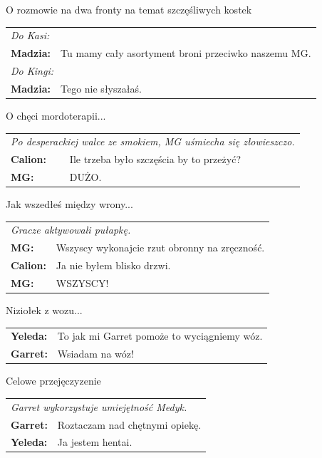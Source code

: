 \documentclass[10pt,twoside,twocolumn]{book}
\begin{document}
\begin{rpg-quotebox}{O rozmowie na dwa fronty na temat szczęśliwych kostek}
   \begin{tabularx}{\columnwidth}{lX}
      \multicolumn{2}{l}{\textit{Do Kasi:}} \\
      \textbf{Madzia:} & Tu mamy cały asortyment broni przeciwko naszemu MG. \\
      \multicolumn{2}{l}{\textit{Do Kingi:}} \\
      \textbf{Madzia:} & Tego nie słyszałaś.
   \end{tabularx}
\end{rpg-quotebox}


\begin{rpg-quotebox}{O chęci mordoterapii...}
   \begin{tabularx}{\columnwidth}{lX}
      \multicolumn{2}{X}{\textit{Po desperackiej walce ze smokiem, MG uśmiecha się złowieszczo.}}\\
      \textbf{Calion:} & Ile trzeba było szczęścia by to przeżyć? \\
      \textbf{MG:} & DUŻO.\\
   \end{tabularx}
\end{rpg-quotebox}


\begin{rpg-quotebox}{Jak wszedłeś między wrony...}
   \begin{tabularx}{\columnwidth}{lX}
      \multicolumn{2}{l}{\textit{Gracze aktywowali pułapkę.}}\\
      \textbf{MG:} & Wszyscy wykonajcie rzut obronny na zręczność.\\
      \textbf{Calion:} & Ja nie byłem blisko drzwi.\\
      \textbf{MG:} & WSZYSCY!\\
   \end{tabularx}
\end{rpg-quotebox}


\begin{rpg-quotebox}{Niziołek z wozu...}
   \begin{tabularx}{\columnwidth}{lX}
      \textbf{Yeleda:} & To jak mi Garret pomoże to wyciągniemy wóz.\\
      \textbf{Garret:} & Wsiadam na wóz!\\
   \end{tabularx}
\end{rpg-quotebox}


\begin{rpg-quotebox}{Celowe przejęczyzenie}
   \begin{tabularx}{\columnwidth}{lX}
      \multicolumn{2}{l}{\textit{Garret wykorzystuje umiejętność Medyk.}}\\
      \textbf{Garret:} & Roztaczam nad chętnymi opiekę.\\
      \textbf{Yeleda:} & Ja jestem hentai.
   \end{tabularx}
\end{rpg-quotebox}
\end{document}
